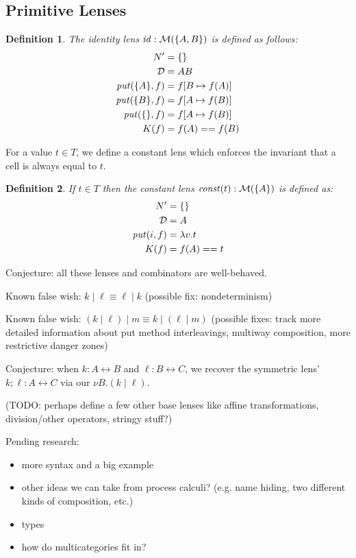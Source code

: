 \documentclass{article}
\newcommand{\lens}{\leftrightarrow}
\newtheorem{definition}{Definition}
\begin{document}
\subsection{Primitive Lenses}


\newcommand{\id}{\mathit{id}}
\begin{definition}
    The identity lens $\id : \mlens{\{A,B\}}$ is defined as follows:
    \begin{align*}
        N' &= \{\} \\
        \mathcal D &= AB \\
        \mathit{put}(\{A\},f) &= f[B \mapsto f(A)] \\
        \mathit{put}(\{B\},f) &= f[A \mapsto f(B)] \\
        \mathit{put}(\{\},f) &= f[A \mapsto f(B)] \\
        K(f) &= f(A) == f(B)
    \end{align*}
\end{definition} 

For a value $t \in T$, we define a constant lens
which enforces the invariant that a cell is always
equal to $t$.

\newcommand{\const}{\mathit{const}}
\begin{definition}
    If $t \in T$ then the constant lens
    $\const(t) : \mlens{\{A\}}$ is defined as:
    \begin{align*}
        N' &= \{\} \\
        \mathcal D &= A \\
        \mathit{put}(i,f) &= \lambda v. t \\
        K(f) &= f(A) == t
    \end{align*}
\end{definition}

Conjecture: all these lenses and combinators are well-behaved.

Known false wish: $k \mid \ell \equiv \ell \mid k$ (possible fix:
nondeterminism)

Known false wish: $(k \mid \ell) \mid m \equiv k \mid (\ell \mid m)$
(possible fixes: track more detailed information about put method
interleavings, multiway composition, more restrictive danger zones)

Conjecture: when $k : A \lens B$ and $\ell : B \lens C$, we recover the
symmetric lens' $k;\ell : A \lens C$ via our $\nu B.(k \mid \ell)$.

(TODO: perhaps define a few other base lenses like affine transformations,
division/other operators, stringy stuff?)

Pending research:
\begin{itemize}
    \item more syntax and a big example
    \item other ideas we can take from process calculi? (e.g. name hiding,
        two different kinds of composition, etc.)
    \item types
    \item how do multicategories fit in?
\end{itemize}
\end{document}
